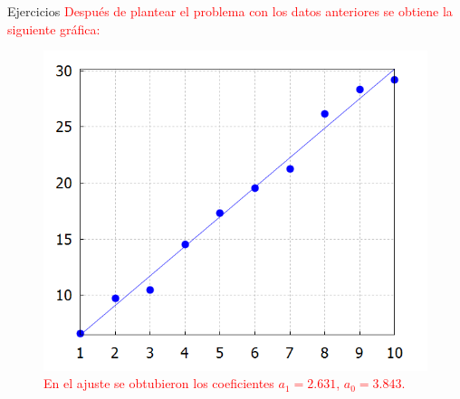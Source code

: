 \begin{frame}{Ejercicios}
\textcolor{red}{Después de plantear el problema con los datos anteriores se obtiene la siguiente gráfica:}
\begin{figure}
\centering
\includegraphics[scale=0.8]{Imagen23}
\caption{\textcolor{red}{En el ajuste se obtubieron los coeficientes $a_1=2.631$, $a_0=3.843$.}} 
\end{figure}
\end{frame}
